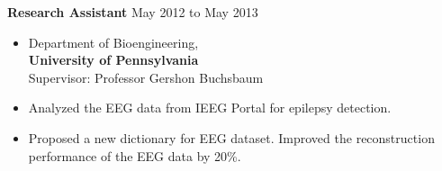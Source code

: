 \documentclass[10pt]{article}
\renewcommand{\section}[1]{\pagebreak[3]%
    \hyphenpenalty=10000%
    \vspace{1.3\baselineskip}%
    \phantomsection\addcontentsline{toc}{section}{#1}%
    \noindent\llap{\scshape\smash{\parbox[t]{\marginparwidth}{\raggedright #1}}}%
    \vspace{-\baselineskip}\par}
\newenvironment{innerlist}[1][\enskip\textbullet]%
        {\begin{itemize}[#1,leftmargin=*,parsep=0pt,itemsep=0pt,topsep=0pt,partopsep=0pt]}
        {\end{itemize}}
\begin{document}

\textbf{Research Assistant} \hfill {May 2012 to May 2013}
\begin{innerlist}
\item[] Department of Bioengineering,\\
\textbf{University of Pennsylvania}\\
Supervisor: Professor Gershon Buchsbaum        
\item Analyzed the EEG data from IEEG Portal for epilepsy detection.
\item Proposed a new dictionary for EEG dataset. Improved the reconstruction performance of the EEG data by 20\%. \\
\end{innerlist}



\end{document}
